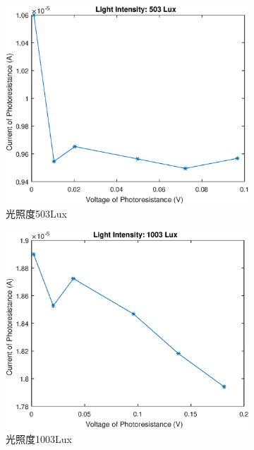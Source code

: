 \documentclass{ctexart}
\begin{document}
\begin{figure}[H]
  \centering
  \begin{subfigure}{.45\textwidth}
    \centering
    \includegraphics[width=\linewidth]{光电传感器综合实验图像/photocell_503Lux}
    \caption{光照度503Lux}
  \end{subfigure}
  \begin{subfigure}{.45\textwidth}
    \centering
    \includegraphics[width=\linewidth]{光电传感器综合实验图像/photocell_1003Lux}
    \caption{光照度1003Lux}
  \end{subfigure}
  \begin{subfigure}{.45\textwidth}

\end{subfigure}
\end{figure}
\end{document}
